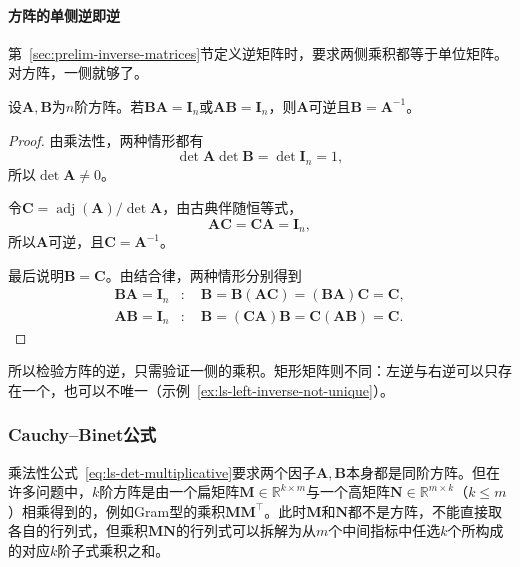 \paragraph{方阵的单侧逆即逆}
\label{sec:ls-square-one-sided-inverse}
第~\ref{sec:prelim-inverse-matrices}节定义逆矩阵时，要求两侧乘积都等于单位矩阵。对方阵，一侧就够了。
\begin{theorem}[方阵的单侧逆即逆]
\label{thm:ls-square-one-sided-inverse}
设$\bm A,\bm B$为$n$阶方阵。若$\bm B\bm A=\bm I_n$或$\bm A\bm B=\bm I_n$，则$\bm A$可逆且$\bm B=\bm A^{-1}$。
\end{theorem}
\begin{proof}
由乘法性，两种情形都有
\[
 \det\bm A\det\bm B=\det\bm I_n=1,
\]
所以$\det\bm A\neq0$。

令$\bm C=\operatorname{adj}(\bm A)/\det\bm A$，由古典伴随恒等式，
\[
 \bm A\bm C=\bm C\bm A=\bm I_n,
\]
所以$\bm A$可逆，且$\bm C=\bm A^{-1}$。

最后说明$\bm B=\bm C$。由结合律，两种情形分别得到
\[
 \begin{aligned}
 \bm B\bm A=\bm I_n&:\quad\bm B=\bm B(\bm A\bm C)=(\bm B\bm A)\bm C=\bm C,\\
 \bm A\bm B=\bm I_n&:\quad\bm B=(\bm C\bm A)\bm B=\bm C(\bm A\bm B)=\bm C.
 \end{aligned}
\]
\end{proof}
所以检验方阵的逆，只需验证一侧的乘积。矩形矩阵则不同：左逆与右逆可以只存在一个，也可以不唯一（示例~\ref{ex:ls-left-inverse-not-unique}）。

\subsubsection{Cauchy--Binet公式}
\label{sec:ls-cauchy-binet}

乘法性公式~\eqref{eq:ls-det-multiplicative}要求两个因子$\bm A,\bm B$本身都是同阶方阵。但在许多问题中，$k$阶方阵是由一个扁矩阵$\bm M\in\mathbb R^{k\times m}$与一个高矩阵$\bm N\in\mathbb R^{m\times k}$（$k\leq m$）相乘得到的，例如Gram型的乘积$\bm M\bm M^\top$。此时$\bm M$和$\bm N$都不是方阵，不能直接取各自的行列式，但乘积$\bm M\bm N$的行列式可以拆解为从$m$个中间指标中任选$k$个所构成的对应$k$阶子式乘积之和。

